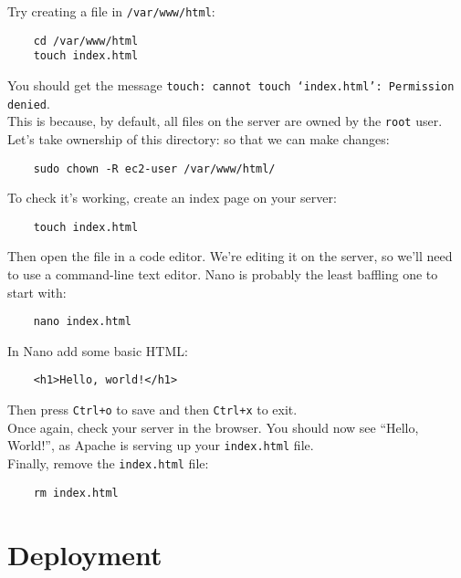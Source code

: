 Try creating a file in \texttt{/var/www/html}:

\begin{verbatim}
    cd /var/www/html
    touch index.html
\end{verbatim}

You should get the message \texttt{touch: cannot touch `index.html': Permission denied}.
\\

This is because, by default, all files on the server are owned by the \texttt{root} user.
\\

Let's take ownership of this directory: so that we can make changes:

\begin{verbatim}
    sudo chown -R ec2-user /var/www/html/
\end{verbatim}

To check it's working, create an index page on your server:

\begin{verbatim}
    touch index.html
\end{verbatim}

Then open the file in a code editor. We're editing it on the server, so we'll need to use a command-line text editor. Nano is probably the least baffling one to start with:

\begin{verbatim}
    nano index.html
\end{verbatim}

In Nano add some basic HTML:

\begin{verbatim}
    <h1>Hello, world!</h1>
\end{verbatim}

Then press \texttt{Ctrl+o} to save and then \texttt{Ctrl+x} to exit.
\\

Once again, check your server in the browser. You should now see ``Hello, World!'', as Apache is serving up your \texttt{index.html} file.
\\

Finally, remove the \texttt{index.html} file:

\begin{verbatim}
    rm index.html
\end{verbatim}


\section{Deployment}

